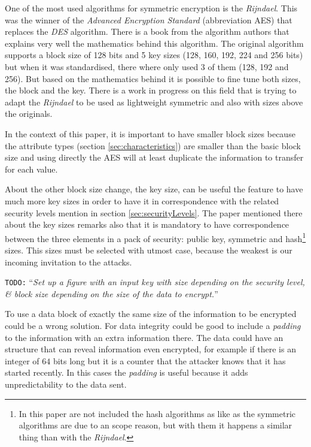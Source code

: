 \documentclass[10pt,a4paper,twoside]{llncs}
\newcommand{\todo}[1]{\texttt{\color{red}TODO:} ``\emph{#1}''}
\begin{document}
One of the most used algorithms for symmetric encryption is the \emph{Rijndael}. This was the winner of the \emph{Advanced Encryption Standard} (abbreviation AES) \cite{AES-FIPS} that replaces the \emph{DES} algorithm. There is a book \cite{Daemen:2002:DR:560131} from the algorithm authors that explains very well the mathematics behind this algorithm. The original algorithm supports a block size of 128 bits and 5 key sizes (128, 160, 192, 224 and 256 bits) but when it was standardised, there where only used 3 of them (128, 192 and 256). But based on the mathematics behind it is possible to fine tune both sizes, the block and the key. There is a work in progress on this field \cite{gRijndael} that is trying to adapt the \emph{Rijndael} to be used as lightweight symmetric and also with sizes above the originals.

In the context of this paper, it is important to have smaller block sizes because the attribute types (section \ref{sec:characteristics}) are smaller than the basic block size and using directly the AES will at least duplicate the information to transfer for each value.

About the other block size change, the key size, can be useful the feature to have much more key sizes in order to have it in correspondence with the related security levels mention in section \ref{sec:securityLevels}. The paper mentioned there \cite{lenstrauniversal13} about the key sizes remarks also that it is mandatory to have correspondence between the three elements in a pack of security: public key, symmetric and hash\footnote{In this paper are not included the hash algorithms as like as the symmetric algorithms are due to an scope reason, but with them it happens a similar thing than with the \emph{Rijndael}.} sizes. This sizes must be selected with utmost case, because the weakest is our incoming invitation to the attacks.

\todo{Set up a figure with an input key with size depending on the security level, \& block size depending on the size of the data to encrypt.}

To use a data block of exactly the same size of the information to be encrypted could be a wrong solution. For data integrity could be good to include a \emph{padding} to the information with an extra information there. The data could have an structure that can reveal information even encrypted, for example if there is an integer of $64$ bits long but it is a counter that the attacker knows that it has started recently. In this cases the \emph{padding} is useful because it adds unpredictability to the data sent.
\end{document}
